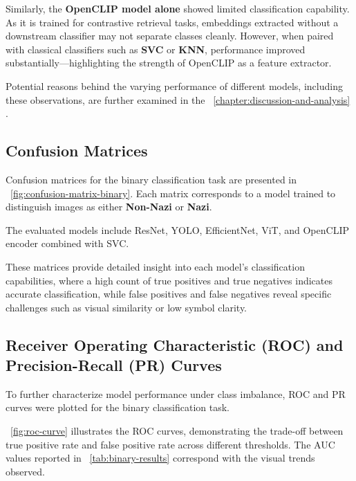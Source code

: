 Similarly, the \textbf{OpenCLIP model alone} showed limited classification capability. As it is trained for
contrastive retrieval tasks, embeddings extracted without a downstream classifier may not separate classes cleanly.
However, when paired with classical classifiers such as \textbf{SVC} or \textbf{KNN}, performance improved
substantially—highlighting the strength of OpenCLIP as a feature extractor.

Potential reasons behind the varying performance of different models, including these observations, are further
examined in the ~\autoref{chapter:discussion-and-analysis} .





\newpage

\subsection{Confusion Matrices}

Confusion matrices for the binary classification task are presented in ~\autoref{fig:confusion-matrix-binary}. Each
matrix corresponds to a model trained to distinguish images as either \textbf{Non-Nazi} or \textbf{Nazi}.

The evaluated models include \ac{ResNet}, \ac{YOLO}, EfficientNet, \ac{ViT}, and OpenCLIP encoder combined with \ac{SVC}.

These matrices provide detailed insight into each model’s classification capabilities, where a high count of true
positives and true negatives indicates accurate classification, while false positives and false negatives reveal
specific challenges such as visual similarity or low symbol clarity.



\subsection{Receiver Operating Characteristic (ROC) and Precision-Recall (PR) Curves}

To further characterize model performance under class imbalance, \ac{ROC} and \ac{PR} curves were plotted for the
binary classification task.

~\autoref{fig:roc-curve} illustrates the \ac{ROC} curves, demonstrating the trade-off between true positive rate
and false positive rate across different thresholds. The \ac{AUC} values reported in ~\autoref{tab:binary-results}
correspond with the visual trends observed.


